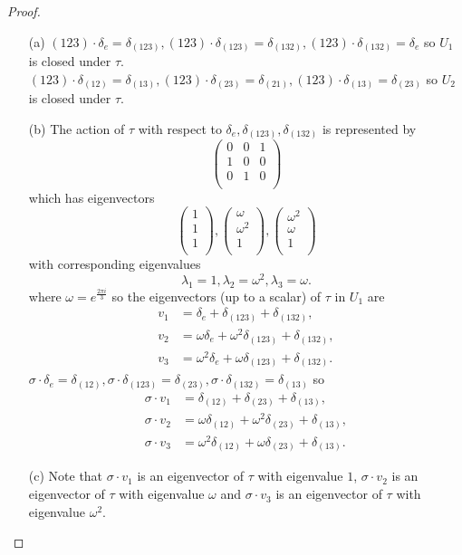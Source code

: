 \documentclass{article}
\begin{document}
\begin{proof}
\begin{enumerate}
    \item[(a)]$(123)\cdot\delta_e=\delta_{(123)},(123)\cdot\delta_{(123)}=\delta_{(132)},(123)\cdot\delta_{(132)}=\delta_{e}$ so $U_1$ is closed under $\tau$. $(123)\cdot\delta_{(12)}=\delta_{(13)},(123)\cdot\delta_{(23)}=\delta_{(21)},(123)\cdot\delta_{(13)}=\delta_{(23)}$ so $U_2$ is closed under $\tau$.
    \item[(b)]The action of $\tau$ with respect to $\delta_e,\delta_{(123)},\delta_{(132)}$ is represented by\[\begin{pmatrix}
0 & 0 & 1 \\
1 & 0 & 0 \\
0 & 1 & 0 \\
\end{pmatrix}\] which has eigenvectors \[\begin{pmatrix}
    1\\
    1\\
    1\\
\end{pmatrix},\begin{pmatrix}
    \omega\\
    \omega^2\\
    1\\
\end{pmatrix},\begin{pmatrix}
    \omega^2\\
    \omega\\
    1\\
\end{pmatrix}\] with corresponding eigenvalues\[\lambda_1=1,\lambda_2=\omega^2,\lambda_3=\omega.\] where $\omega=e^{\frac{2\pi i}{3}}$ so the eigenvectors (up to a scalar) of $\tau$ in $U_1$ are \begin{align*}
    v_1&=\delta_e+\delta_{(123)}+\delta_{(132)},\\v_2&=\omega\delta_e+\omega^2\delta_{(123)}+\delta_{(132)},\\v_3&=\omega^2\delta_e+\omega\delta_{(123)}+\delta_{(132)}.
    \end{align*}
    $\sigma\cdot\delta_{e}=\delta_{(12)},\sigma\cdot\delta_{(123)}=\delta_{(23)},\sigma\cdot\delta_{(132)}=\delta_{(13)}$ so
\begin{align*}
    \sigma\cdot v_1&=\delta_{(12)}+\delta_{(23)}+\delta_{(13)},\\\sigma\cdot v_2&=\omega\delta_{(12)}+\omega^2\delta_{(23)}+\delta_{(13)},\\\sigma\cdot v_3&=\omega^2\delta_{(12)}+\omega\delta_{(23)}+\delta_{(13)}.
    \end{align*}
\item[(c)] Note that $\sigma\cdot v_1$ is an eigenvector of $\tau$ with eigenvalue $1$, $\sigma\cdot v_2$ is an eigenvector of $\tau$ with eigenvalue $\omega$ and $\sigma\cdot v_3$ is an eigenvector of $\tau$ with eigenvalue $\omega^2$.


\end{enumerate}
\end{proof}
\end{document}
